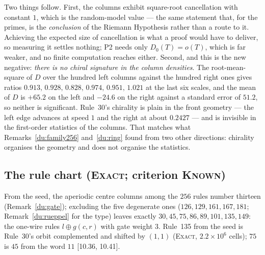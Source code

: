 \documentclass[11pt]{article}
\theoremstyle{definition}
\theoremstyle{remark}
\newcommand{\EXACT}{\textsc{Exact}}
\newcommand{\KNOWN}{\textsc{Known}}
\begin{document}
Two things follow. First, the columns exhibit square-root cancellation with constant $1$, which is the
random-model value --- the same statement that, for the primes, is the \emph{conclusion} of the Riemann
Hypothesis rather than a route to it. Achieving the expected size of cancellation is what a proof would
have to deliver, so measuring it settles nothing; P2 needs only $D_0(T)=o(T)$, which is far weaker, and
no finite computation reaches either. Second, and this is the new negative: \emph{there is no chiral
signature in the column densities}. The root-mean-square of $D$ over the hundred left columns against the
hundred right ones gives ratios $0.913,\,0.928,\,0.828,\,0.974,\,0.951,\,1.021$ at the last six scales,
and the mean of $D$ is $+65.2$ on the left and $-24.6$ on the right against a standard error of $51.2$,
so neither is significant. Rule~30's chirality is plain in the front geometry --- the left edge advances
at speed $1$ and the right at about $0.2427$ --- and is invisible in the first-order statistics of the
columns. That matches what Remarks~\ref{du:family256} and~\ref{du:ring} found from two other directions:
chirality organises the geometry and does not organise the statistics.

\subsection*{The rule chart (\EXACT; criterion \KNOWN)}
From the seed, the aperiodic centre columns among the $256$ rules number thirteen (Remark~\ref{du:gate}); excluding the five degenerate ones ($126,129,161,167,181$; Remark~\ref{du:rueppel} for the type) leaves exactly $30,45,75,86,89,101,135,149$: the one-wire rules $l\oplus g(c,r)$ with gate weight $3$. Rule~135 from the seed is Rule~30's orbit complemented and shifted by $(1,1)$ (\EXACT, $2.2\times10^6$ cells); $75$ is $45$ from the word $11$ [10.36, 10.41].
\end{document}
